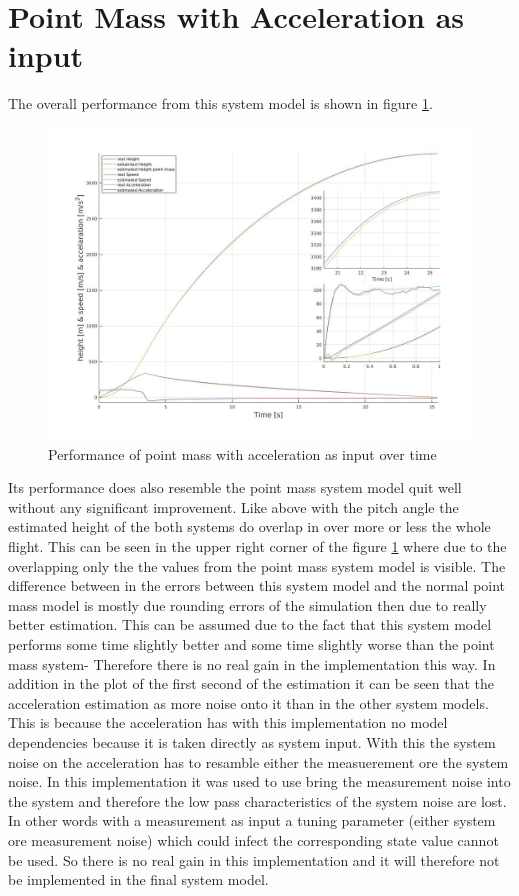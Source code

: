 \newpage
\section{Point Mass with Acceleration as input}
The overall performance from this system model is shown in figure \ref{fig:PointMassAccInputPerformance}.

\begin{figure}[h!]
 \centering
 \includegraphics[width=.8 \textwidth]{./Pictures/PointMassAccInputPerformance.jpg}
 \caption{Performance of point mass with acceleration as input over time}
 \label{fig:PointMassAccInputPerformance}
\end{figure}

Its performance does also resemble the point mass system model quit well without any significant improvement.
Like above with the pitch angle the estimated height of the both systems do overlap in over more or less the whole flight.
This can be seen in the upper right corner of the figure \ref{fig:PointMassAccInputPerformance} where due to the overlapping only the the values from the point mass system model is visible.
The difference between in the errors between this system model and the normal point mass model is mostly due rounding errors of the simulation then due to really better estimation.
This can be assumed due to the fact that this system model performs some time slightly better and some time slightly worse than the point mass system-
Therefore there is no real gain in the implementation this way.
In addition in the plot of the first second of the estimation it can be seen that the acceleration estimation as more noise onto it than in the other system models.
This is because the acceleration has with this implementation no model dependencies because it is taken directly as system input.
With this the system noise on the acceleration has to resamble either the measuerement ore the system noise.
In this implementation it was used to use bring the measurement noise into the system and therefore the low pass characteristics of the system noise are lost.
In other words with a measurement as input a tuning parameter (either system ore measurement noise) which could infect the corresponding state value cannot be used.
So there is no real gain in this implementation and it will therefore not be implemented in the final system model.

